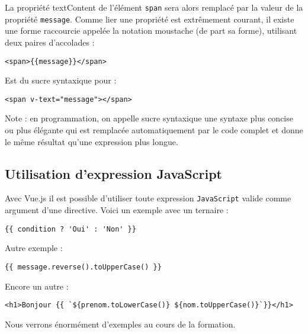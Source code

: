 La propriété {\color{blue}textContent} de l'élément {\tt span} sera alors remplacé par la valeur de la propriété {\tt message}. Comme lier une propriété est extrêmement courant, il existe une forme raccourcie appelée la notation moustache (de part sa forme), utilisant deux paires d'accolades :
\begin{verbatim}
<span>{{message}}</span>
\end{verbatim}

Est du sucre syntaxique pour :
\begin{verbatim}
<span v-text="message"></span>
\end{verbatim}

Note : en programmation, on appelle sucre syntaxique une syntaxe plus concise ou plus élégante qui est remplacée automatiquement par le code complet et donne le même résultat qu'une expression plus longue.

\subsection{Utilisation d'expression JavaScript}
Avec {\color{monOrange}Vue.js} il est possible d'utiliser toute expression {\tt JavaScript} valide comme argument d'une directive. Voici un exemple avec un ternaire :
\begin{verbatim}
{{ condition ? 'Oui' : 'Non' }}
\end{verbatim}
Autre exemple :
\begin{verbatim}
{{ message.reverse().toUpperCase() }}
\end{verbatim}

Encore un autre :
\begin{verbatim}
<h1>Bonjour {{ `${prenom.toLowerCase()} ${nom.toUpperCase()}`}}</h1>
\end{verbatim}

Nous verrons énormément d'exemples au cours de la formation.



